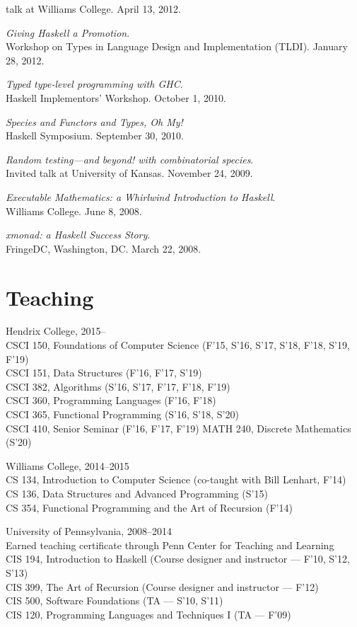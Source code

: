 \documentclass[12pt]{article}
\newcommand{\cvitem}{\par\hangpara{2em}{1}}
\begin{document}
    talk at Williams College. April 13, 2012.
\cvitem \emph{Giving Haskell a Promotion}. \\ Workshop on Types in
    Language Design and Implementation (TLDI). January 28, 2012.
\cvitem \emph{Typed type-level programming with GHC}. \\ Haskell
    Implementors' Workshop. October 1, 2010.
\cvitem \emph{Species and Functors and Types, Oh My!} \\ Haskell
    Symposium. September 30, 2010.
\cvitem \emph{Random testing---and beyond! with combinatorial
    species}. \\ Invited talk at University of Kansas.  November 24, 2009.
\cvitem \emph{Executable Mathematics: a Whirlwind Introduction to
    Haskell}. \\ Williams College.  June 8, 2008.
\cvitem \emph{xmonad: a Haskell Success Story}. \\ FringeDC, Washington,
    DC. March 22, 2008.

\section*{Teaching}

\cvitem
Hendrix College, 2015-- \\
CSCI 150, Foundations of Computer Science (F'15, S'16, S'17, S'18,
F'18, S'19, F'19) \\
CSCI 151, Data Structures (F'16, F'17, S'19) \\
CSCI 382, Algorithms (S'16, S'17, F'17, F'18, F'19) \\
CSCI 360, Programming Languages (F'16, F'18) \\
CSCI 365, Functional Programming (S'16, S'18, S'20) \\
CSCI 410, Senior Seminar (F'16, F'17, F'19)
MATH 240, Discrete Mathematics (S'20)

\cvitem
Williams College, 2014--2015 \\
CS 134, Introduction to Computer Science (co-taught with Bill Lenhart,
F'14) \\
CS 136, Data Structures and Advanced Programming (S'15) \\
CS 354, Functional Programming and the Art of Recursion (F'14)

\cvitem
University of Pennsylvania, 2008--2014 \\
Earned teaching certificate through Penn Center for Teaching and
Learning \\
CIS 194, Introduction to Haskell (Course designer and instructor ---
F'10, S'12, S'13) \\
CIS 399, The Art of Recursion (Course designer and instructor ---
F'12) \\
CIS 500, Software Foundations (TA --- S'10, S'11) \\
CIS 120, Programming Languages and Techniques I (TA --- F'09)
\end{document}
